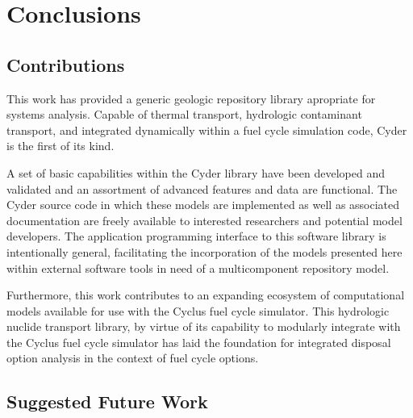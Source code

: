 \chapter{Conclusions}\label{ch:conclusion}
\section{Contributions}

This work has provided a generic geologic repository library apropriate for 
systems analysis. Capable of thermal transport, hydrologic contaminant 
transport, and integrated dynamically within a fuel cycle simulation code,
Cyder is the first of its kind. 

A set of basic capabilities within the Cyder library have been developed and
validated and an assortment of advanced features and data are functional.
The Cyder source code in which these models are implemented as well as 
associated documentation are freely available to interested researchers and 
potential model developers. The application programming interface to this 
software library is intentionally general, facilitating the incorporation of 
the models presented here within external software tools in need of a 
multicomponent repository model.

Furthermore, this work contributes to an expanding ecosystem of computational 
models available for use with the Cyclus fuel cycle simulator. This hydrologic 
nuclide transport library, by virtue of its capability to modularly integrate 
with the Cyclus fuel cycle simulator has laid the foundation for integrated 
disposal option analysis in the context of fuel cycle options. 

\section{Suggested Future Work}
